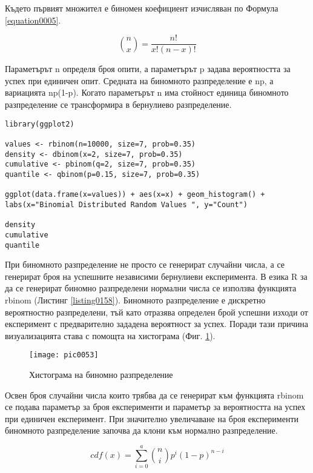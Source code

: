 Където първият множител е биномен коефициент изчисляван по Формула \ref{equation0005}.

\begin{equation}
\binom{n}{x} = \frac{n!}{x!(n-x)!}
\label{equation0005}
\end{equation}

Параметърът n определя броя опити, а параметърът p задава вероятността за успех при единичен опит. Средната на биномното разпределение е np, а вариацията np(1-p). Когато параметърът n има стойност единица биномното разпределение се трансформира в бернулиево разпределение. 

\begin{lstlisting}[caption=Биномно разпределение, label=listing0158]
library(ggplot2)

values <- rbinom(n=10000, size=7, prob=0.35)
density <- dbinom(x=2, size=7, prob=0.35)
cumulative <- pbinom(q=2, size=7, prob=0.35)
quantile <- qbinom(p=0.15, size=7, prob=0.35)

ggplot(data.frame(x=values)) + aes(x=x) + geom_histogram() + labs(x="Binomial Distributed Random Values ", y="Count")

density
cumulative
quantile
\end{lstlisting}

При биномното разпределение не просто се генерират случайни числа, а се генерират броя на успешните независими бернулиеви експеримента. В езика R за да се генерират биномно разпределени нормални числа се използва функцията rbinom (Листинг \ref{listing0158}). Биномното разпределение е дискретно вероятностно разпределени, тъй като отразява определен брой успешни изходи от експеримент с предварително зададена вероятност за успех. Поради тази причина визуализацията става с помощта на хистограма (Фиг. \ref{figure0053}).

\begin{figure}[h!]
  \centering
  \texttt{[image: pic0053]}
  \caption{Хистограма на биномно разпределение}
\label{figure0053}
\end{figure}
\FloatBarrier

Освен броя случайни числа които трябва да се генерират към функцията rbinom се подава параметър за броя експерименти и параметър за вероятността на успех при единичен експеримент. При значително увеличаване на броя експерименти биномното разпределение започва да клони към нормално разпределение. 

\begin{equation}
cdf(x) = \sum_{i=0}^{a}\binom{n}{i}p^{i}(1-p)^{n-i}
\label{equation0006}
\end{equation}


